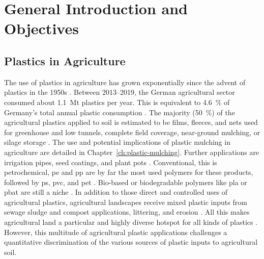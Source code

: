 
\chapter{General Introduction and Objectives}
\label{ch:intro}

\section{Plastics in Agriculture}

The use of plastics in agriculture has grown exponentially since the advent of plastics in the 1950s \citep{MormileWorld2017,GeyerProduction2017}.
Between \numrange[range-phrase={ and }]{2013}{2019}, the German agricultural sector consumed about \SI{1.1}{\mega\tonne} plastics per year. This is equivalent to \SI{4.6}{\percent} of Germany's total annual plastic consumption \citep{BertlingKunststoffe2021}.
The majority (\SI{50}{\percent}) of the agricultural plastics applied to soil is estimated to be films, fleeces, and nets used for greenhouse and low tunnels, complete field coverage, near-ground mulching, or silage storage \citep{MormileWorld2017,BertlingKunststoffe2021}. The use and potential implications of plastic mulching in agriculture are detailed in Chapter~\ref{ch:plastic-mulching}.
Further applications are irrigation pipes, seed coatings, and plant pots \citep{BertlingKunststoffe2021}. Conventional, this is petrochemical, \ac{pe} and \ac{pp} are by far the most used polymers for these products, followed by \ac{ps}, \ac{pvc}, and \ac{pet} \citep{PlasticsEuropePlastics2019,ZhangNonbiodegradable2021}. Bio-based or biodegradable polymers like \ac{pla} or \ac{pbat} are still a niche \citep{PlasticsEuropePlastics2019,BertlingKunststoffe2021}.
In addition to those direct and controlled uses of agricultural plastics, agricultural landscapes receive mixed plastic inputs from sewage sludge and compost applications, littering, and erosion \citep{HurleyFate2018,BlasingPlastics2018,StubbinsPlastics2021}.
All this makes agricultural land a particular and highly diverse hotspot for all kinds of plastics \citep{CorradiniMicroplastics2021,ZhangNonbiodegradable2021}.
However, this multitude of agricultural plastic applications challenges a quantitative discrimination of the various sources of plastic inputs to agricultural soil.

